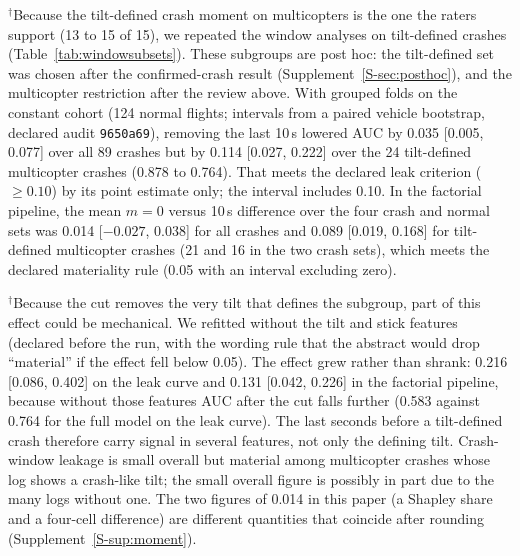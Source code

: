 \documentclass[preprint,12pt]{elsarticle}
\begin{document}
$^\dagger$Because the tilt-defined crash moment on multicopters is the one the raters support (13 to 15 of 15), we repeated the window analyses on tilt-defined crashes (Table~\ref{tab:windowsubsets}). These subgroups are post hoc: the tilt-defined set was chosen after the confirmed-crash result (Supplement~\ref{S-sec:posthoc}), and the multicopter restriction after the review above. With grouped folds on the constant cohort (124 normal flights; intervals from a paired vehicle bootstrap, declared audit \texttt{9650a69}), removing the last 10\,s lowered AUC by 0.035 [0.005, 0.077] over all 89 crashes but by 0.114 [0.027, 0.222] over the 24 tilt-defined multicopter crashes (0.878 to 0.764). That meets the declared leak criterion ($\ge 0.10$) by its point estimate only; the interval includes 0.10. In the factorial pipeline, the mean $m=0$ versus 10\,s difference over the four crash and normal sets was 0.014 [$-0.027$, 0.038] for all crashes and 0.089 [0.019, 0.168] for tilt-defined multicopter crashes (21 and 16 in the two crash sets), which meets the declared materiality rule (0.05 with an interval excluding zero).

$^\dagger$Because the cut removes the very tilt that defines the subgroup, part of this effect could be mechanical. We refitted without the tilt and stick features (declared before the run, with the wording rule that the abstract would drop ``material'' if the effect fell below 0.05). The effect grew rather than shrank: 0.216 [0.086, 0.402] on the leak curve and 0.131 [0.042, 0.226] in the factorial pipeline, because without those features AUC after the cut falls further (0.583 against 0.764 for the full model on the leak curve). The last seconds before a tilt-defined crash therefore carry signal in several features, not only the defining tilt. Crash-window leakage is small overall but material among multicopter crashes whose log shows a crash-like tilt; the small overall figure is possibly in part due to the many logs without one. The two figures of 0.014 in this paper (a Shapley share and a four-cell difference) are different quantities that coincide after rounding (Supplement~\ref{S-sup:moment}).
\end{document}
